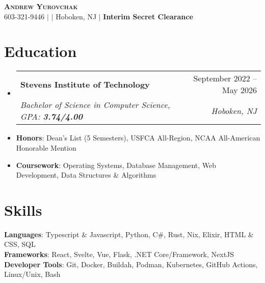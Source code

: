 \documentclass[letterpaper,11pt]{article}
\makeatletter
\newcommand{\resumeItem}[1]{
  \item\small{
    {#1 \vspace{-2pt}}
  }
}
\newcommand{\resumeSubheading}[4]{
  \vspace{-2pt}\item
    \begin{tabular*}{0.97\textwidth}[t]{l@{\extracolsep{\fill}}r}
      \textbf{#1} & #2 \\
      \textit{\small#3} & \textit{\small #4} \\
    \end{tabular*}\vspace{-7pt}
}
\newcommand{\resumeSubItem}[1]{\resumeItem{#1}\vspace{-5pt}}
\newcommand{\resumeSubHeadingListStart}{\begin{itemize}[leftmargin=0.15in, label={}]}
\newcommand{\resumeSubHeadingListEnd}{\end{itemize}}
\makeatother
\begin{document}

\begin{center}
    \textbf{\Huge \scshape Andrew Yurovchak} \\ \vspace{3pt}
    \small 603-321-9446 $|$ \href{mailto:andy@yurovchak.net}{\underline{}} $|$ \small{Hoboken, NJ} 
    $|$
    \small{\textbf{Interim Secret Clearance}}
    \\ \vspace{-7pt}
\end{center}


\section{Education}
  \resumeSubHeadingListStart
    \resumeSubheading
      {Stevens Institute of Technology}{September 2022 -- May 2026}
      {Bachelor of Science in Computer Science, GPA: \textbf{3.74/4.00}}{Hoboken, NJ}
    \resumeSubItem{\textbf{Honors}: Dean's List (5 Semesters), USFCA All-Region, NCAA All-American Honorable Mention}
    \resumeSubItem{\textbf{Coursework}: Operating Systems, Database Management, Web Development, Data Structures \& Algorithms}
    \vspace{-10pt}
  \resumeSubHeadingListEnd


\section{Skills}
 \resumeSubHeadingListStart
    \small{\item{
     \textbf{Languages}{: Typescript \& Javascript, Python, C\#, Rust, Nix, Elixir, HTML \& CSS, SQL} \\
     \textbf{Frameworks}{: React, Svelte, Vue, Flask, .NET Core/Framework, NextJS} \\
     \textbf{Developer Tools}{: Git, Docker, Buildah, Podman, Kubernetes, GitHub Actions, Linux/Unix, Bash}
    }\vspace{-5pt}}
 \resumeSubHeadingListEnd
\end{document}
